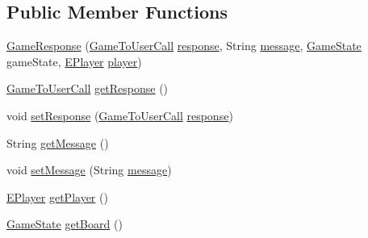 \subsection*{Public Member Functions}
\begin{DoxyCompactItemize}
\item 
\mbox{\hyperlink{classui_1_1_game_response_a6ce5a25d490ee98b2fbfa4abe1dc8333}{Game\+Response}} (\mbox{\hyperlink{enumui_1_1commands_1_1_game_to_user_call}{Game\+To\+User\+Call}} \mbox{\hyperlink{classui_1_1_game_response_a20ad6da79064a1f7060e3b77fcc2c4d1}{response}}, String \mbox{\hyperlink{classui_1_1_game_response_ab844834f62cc4fd08f2ad42e78ec09ac}{message}}, \mbox{\hyperlink{classgame_1_1game_state_1_1_game_state}{Game\+State}} game\+State, \mbox{\hyperlink{enumgame_1_1_e_player}{E\+Player}} \mbox{\hyperlink{classui_1_1_game_response_a7d3c9f3496ce9af6691634acd2740a42}{player}})
\item 
\mbox{\hyperlink{enumui_1_1commands_1_1_game_to_user_call}{Game\+To\+User\+Call}} \mbox{\hyperlink{classui_1_1_game_response_a07e8690d7e6c9b49792c099896bdd617}{get\+Response}} ()
\item 
void \mbox{\hyperlink{classui_1_1_game_response_a0a441c0cd23e925cf68bd34e0917e9dc}{set\+Response}} (\mbox{\hyperlink{enumui_1_1commands_1_1_game_to_user_call}{Game\+To\+User\+Call}} \mbox{\hyperlink{classui_1_1_game_response_a20ad6da79064a1f7060e3b77fcc2c4d1}{response}})
\item 
String \mbox{\hyperlink{classui_1_1_game_response_aeb684a43f6de864778d44a8efea1ac99}{get\+Message}} ()
\item 
void \mbox{\hyperlink{classui_1_1_game_response_a963c44a059ac5377140697f0c7ffdb87}{set\+Message}} (String \mbox{\hyperlink{classui_1_1_game_response_ab844834f62cc4fd08f2ad42e78ec09ac}{message}})
\item 
\mbox{\hyperlink{enumgame_1_1_e_player}{E\+Player}} \mbox{\hyperlink{classui_1_1_game_response_a3f3039c398f9ab6a9761ecd25bc3c9e2}{get\+Player}} ()
\item 
\mbox{\hyperlink{classgame_1_1game_state_1_1_game_state}{Game\+State}} \mbox{\hyperlink{classui_1_1_game_response_a2d410f9ba57b395ba0ef9e31df75044b}{get\+Board}} ()
\end{DoxyCompactItemize}
